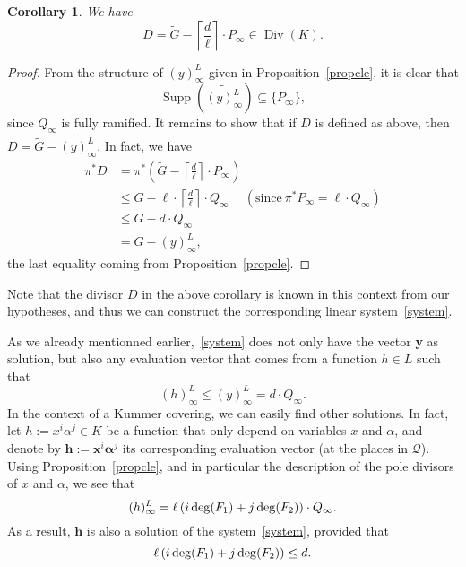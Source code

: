 \documentclass[10pt]{article}
\newtheorem{coro1}[thm]{Corollary}
\theoremstyle{definition}
\theoremstyle{definition}
\theoremstyle{definition}
\newcommand{\cd}{\cdot}
\newcommand{\su}{\subseteq}
\newcommand{\QR}{\mathcal{Q}}
\newcommand{\Div}{\operatorname{Div}}
\newcommand{\Supp}{\operatorname{Supp}}
\begin{document}
\begin{coro1} \label{diviseurDKummer}
We have
\[D = \tilde{G} - \left\lceil\frac{d}{\ell}\right\rceil \cd P_{\infty} \in \Div(K).\]
\end{coro1}

\begin{proof}
From the structure of $(y)^L_{\infty}$ given in Proposition~\ref{propcle}, it is clear that 
\[\Supp\left(\widetilde{(y)^L_{\infty}}\right) \su \{P_{\infty}\},\]
since $Q_{\infty}$ is fully ramified. 
It remains to show that if $D$ is defined as above, then $D = \tilde{G} - \widetilde{(y)^L_{\infty}}$. In fact, we have
\begin{align*}
\pi^*D &= \pi^* \left(\tilde{G} - \left\lceil\frac{d}{\ell}\right\rceil \cd P_{\infty}\right) \\
&\leq G - \ell \cd \left\lceil\frac{d}{\ell}\right\rceil \cd Q_{\infty} \ \quad (\textrm{since} \ \pi^*P_{\infty} = \ell \cd Q_{\infty})\\
& \leq G - d \cd Q_{\infty} \\
&= G-(y)^L_{\infty},
\end{align*}
the last equality coming from Proposition~\ref{propcle}. 
\end{proof}

Note that the divisor $D$ in the above corollary is known in this context from our hypotheses, and thus we can construct the corresponding linear system~\eqref{system}.

As we already mentionned earlier,~\eqref{system} does not only have the vector \textbf{y} as solution, but also any evaluation vector that comes from a function $h \in L$ such that 
\[(h)^L_{\infty} \leq (y)^L_{\infty} = d \cd Q_{\infty}.\]
In the context of a Kummer covering, we can easily find other solutions. In fact, let $h := x^i\alpha^j \in K$ be a function that only depend on variables $x$ and $\alpha$, and denote by $\mathbf{h} := \textbf{x}^i\boldsymbol{\alpha}^j$ its corresponding evaluation vector (at the places in $\QR$). Using Proposition~\ref{propcle}, and in particular the description of the pole divisors of $x$ and $\alpha$, we see that 
\[ (h)^L_{\infty} = \ell \left(i  \deg(F_1)+j \deg(F_{\rm 2})\right) \cd Q_{\infty}.\]
As a result, $\mathbf{h}$ is also a solution of the system~\eqref{system}, provided that
\[\ell \left(i \deg(F_1)+j \deg(F_{\rm 2})\right) \leq d.\]
\end{document}
